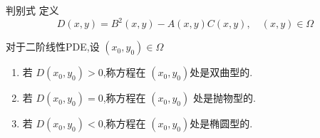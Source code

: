 \documentclass[../../PDE.tex]{subfiles}
\begin{document}
\begin{definition}{判别式}
    定义 \[
    D\left( x,y \right)= B^{2}\left( x,y \right)-A\left( x,y \right)C\left( x,y \right),\quad \left( x,y \right)\in  \Omega      
    \]

    对于二阶线性PDE,设 \(  \left( x_0,y_0 \right)\in  \Omega    \)
    \begin{enumerate}
        \item 若 \(  D\left( x_0,y_0 \right)> 0   \),称方程在 \(  \left( x_0,y_0 \right)   \)处是双曲型的.
        \item 若 \(  D\left( x_0,y_0 \right)= 0   \),称方程在 \(  \left( x_0,y_0 \right)   \)    处是抛物型的.
        \item 若 \(  D\left( x_0,y_0 \right)< 0   \),称方程在 \(  \left( x_0,y_0 \right)   \)处是椭圆型的.  
    \end{enumerate}
     
\end{definition}
\end{document}
